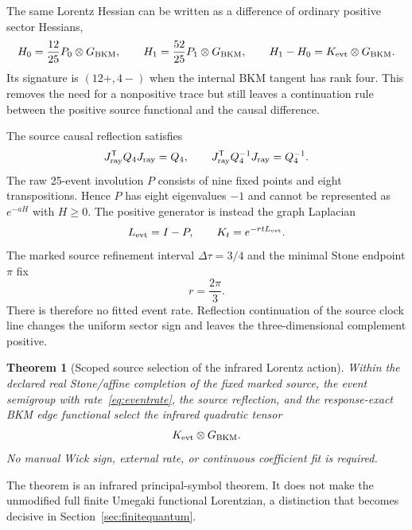\documentclass[11pt]{article}
\newtheorem{theorem}{Theorem}[section]
\theoremstyle{definition}
\theoremstyle{remark}
\begin{document}
The same Lorentz Hessian can be written as a difference of ordinary positive sector Hessians,
\begin{equation}
 H_0=\frac{12}{25}P_0\otimes G_{\rm BKM},
 \qquad
 H_1=\frac{52}{25}P_1\otimes G_{\rm BKM},
 \qquad H_1-H_0=K_{\rm evt}\otimes G_{\rm BKM}.
\end{equation}
Its signature is $(12+,4-)$ when the internal BKM tangent has rank four. This removes the need for a nonpositive trace but still leaves a continuation rule between the positive source functional and the causal difference.

The source causal reflection satisfies
\begin{equation}
 J_{\rm ray}^{\mathsf T}Q_4J_{\rm ray}=Q_4,
 \qquad
 J_{\rm ray}^{\mathsf T}Q_4^{-1}J_{\rm ray}=Q_4^{-1}.
\end{equation}
The raw 25-event involution $P$ consists of nine fixed points and eight transpositions. Hence $P$ has eight eigenvalues $-1$ and cannot be represented as $e^{-aH}$ with $H\ge0$. The positive generator is instead the graph Laplacian
\begin{equation}
 L_{\rm evt}=I-P,
 \qquad K_t=e^{-rtL_{\rm evt}}.
\end{equation}
The marked source refinement interval $\Delta\tau=3/4$ and the minimal Stone endpoint $\pi$ fix
\begin{equation}\label{eq:eventrate}
 r=\frac{2\pi}{3}.
\end{equation}
There is therefore no fitted event rate. Reflection continuation of the source clock line changes the uniform sector sign and leaves the three-dimensional complement positive.

\begin{theorem}[Scoped source selection of the infrared Lorentz action]\label{thm:iraction}
Within the declared real Stone/affine completion of the fixed marked source, the event semigroup with rate~\eqref{eq:eventrate}, the source reflection, and the response-exact BKM edge functional select the infrared quadratic tensor
\begin{equation}
 K_{\rm evt}\otimes G_{\rm BKM}.
\end{equation}
No manual Wick sign, external rate, or continuous coefficient fit is required.
\end{theorem}

The theorem is an infrared principal-symbol theorem. It does not make the unmodified full finite Umegaki functional Lorentzian, a distinction that becomes decisive in Section~\ref{sec:finitequantum}.
\end{document}
